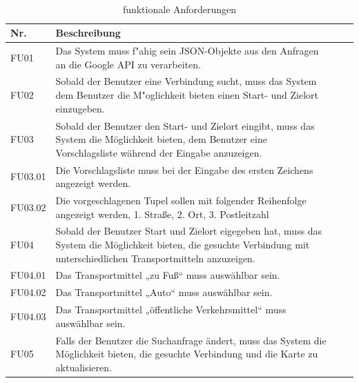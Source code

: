 \documentclass[a4paper, 11pt]{scrreprt}
\begin{document}
\begin{table}[h]

\caption{funktionale Anforderungen}

\ \\

\par

\label{tab:Tabelle1}

\centering

\begin{tabular}{|p{2.5cm} p{12cm}| ll}

\hline

Nr.	& Beschreibung\\

\hline

FU01 &	Das System muss f"ahig sein JSON-Objekte aus den Anfragen an die Google API zu verarbeiten.\\

\hline
FU02 &	Sobald der Benutzer eine Verbindung sucht, muss das System dem Benutzer die M"oglichkeit bieten einen Start- und Zielort einzugeben.\\

\hline
FU03& Sobald der Benutzer den Start- und Zielort eingibt, muss das System die Möglichkeit bieten, dem Benutzer eine Vorschlagsliste während der Eingabe anzuzeigen.\\

\hline
FU03.01	&Die Vorschlagsliste muss bei der Eingabe des ersten Zeichens angezeigt werden.\\

\hline
FU03.02	&Die vorgeschlagenen Tupel sollen mit folgender Reihenfolge angezeigt werden, 1. Straße, 2. Ort, 3. Postleitzahl\\

\hline
FU04	&Sobald der Benutzer Start und Zielort eigegeben hat, muss das System die Möglichkeit bieten, die gesuchte Verbindung mit unterschiedlichen Transportmitteln anzuzeigen.\\

\hline
FU04.01	&Das Transportmittel „zu Fuß“ muss auswählbar sein.\\

\hline
FU04.02&	Das Transportmittel  „Auto“ muss auswählbar sein.\\

\hline
FU04.03	&Das Transportmittel „öffentliche Verkehrsmittel“ muss auswählbar sein.\\

\hline
FU05	&Falls der Benutzer die Suchanfrage ändert, muss das System die Möglichkeit bieten, die gesuchte Verbindung und die Karte zu aktualisieren.\\


\end{tabular}
\end{table}
\end{document}

